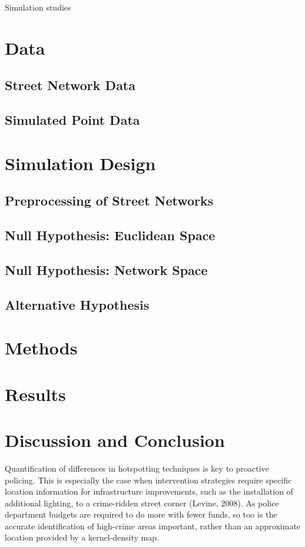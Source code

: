 \documentclass[12pt, letterpaper]{article}
\begin{document}
Simulation studies

\section{Data}
\subsection{Street Network Data}
\subsection{Simulated Point Data}

\section{Simulation Design}
\subsection{Preprocessing of Street Networks} %
\subsection{Null Hypothesis: Euclidean Space}
\subsection{Null Hypothesis: Network Space}
\subsection{Alternative Hypothesis}

\section{Methods}

\section{Results}
\section{Discussion and Conclusion}
Quantification of differences in hotspotting techniques is key to proactive policing. This is especially the case when intervention strategies require specific location information for infrastructure improvements, such as the installation of additional lighting, to a crime-ridden street corner (Levine, 2008). As police department budgets are required to do more with fewer funds, so too is the accurate identification of high-crime areas important, rather than an approximate location provided by a kernel-density map.


\newpage
{}


\end{document}
